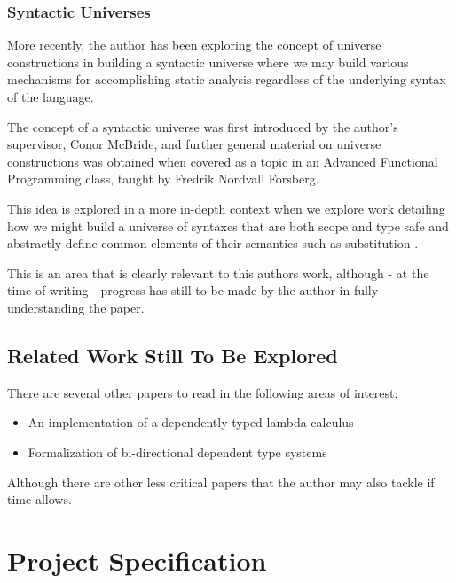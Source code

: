 \documentclass{ProgressReport}[2020/09/15]
\begin{document}
          \subsection{Syntactic Universes}

          More recently, the author has been exploring the concept of
          universe constructions in building a syntactic universe
          where we may build various mechanisms for accomplishing
          static analysis regardless of the underlying syntax of the
          language.

          The concept of a syntactic universe was first introduced by
          the author's supervisor, Conor McBride, and further general
          material on universe constructions was obtained when covered
          as a topic in an Advanced Functional Programming class, taught
          by Fredrik Nordvall Forsberg.

          This idea is explored in a more in-depth context when we
          explore work detailing how we might build a universe of
          syntaxes that are both scope and type safe and abstractly
          define common elements of their semantics such as
          substitution \cite{DBLP:journals/corr/abs-2001-11001}.

          This is an area that is clearly relevant to this authors
          work, although - at the time of writing - progress has still
          to be made by the author in fully understanding the paper.

          \section{Related Work Still To Be Explored}

          There are several other papers to read in the following
          areas of interest:

          \begin{itemize}
          \item An implementation of a dependently typed lambda
            calculus \cite{ATutorialImplementationOfDTLC}
          \item Formalization of bi-directional dependent type systems \cite{TypesWhoSayNi}
          \end{itemize}

          Although there are other less critical papers that the
          author may also tackle if time allows.
       
        \chapter{Project Specification}
\end{document}
